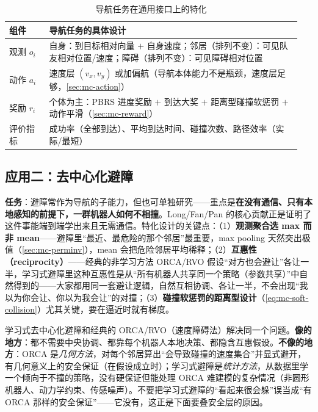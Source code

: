 \begin{table}[H]\centering\small
\caption{导航任务在通用接口上的特化}
\label{tab:mc-app-nav}
\begin{tabular}{p{0.13\linewidth}p{0.82\linewidth}}
\toprule
组件 & 导航任务的具体设计 \\
\midrule
观测 $o_i$ & 自身：到目标相对向量 $+$ 自身速度；邻居（排列不变）：可见队友相对位置/速度；障碍（排列不变）：可见障碍相对位置 \\
动作 $a_i$ & 速度层 $(v_x,v_y)$ 或加偏航（导航本体能力不是瓶颈，速度层足够，\cref{sec:mc-action}） \\
奖励 $r_i$ & 个体为主：PBRS 进度奖励 $+$ 到达大奖 $+$ 距离型碰撞软惩罚 $+$ 动作平滑（\cref{sec:mc-reward}） \\
评价指标 & 成功率（全部到达）、平均到达时间、碰撞次数、路径效率（实际/最短） \\
\bottomrule
\end{tabular}
\end{table}

\subsection{应用二：去中心化避障}
\label{sec:mc-app-avoid}
\textbf{任务}：避障常作为导航的子能力，但也可单独研究——重点是\textbf{在没有通信、只有本地感知的前提下，一群机器人如何不相撞}。Long/Fan/Pan 的核心贡献正是证明了这件事能端到端学出来且无需通信\cite{long2018collision}。特化设计的关键点：（1）\textbf{观测聚合选 max 而非 mean}——避障里“最近、最危险的那个邻居”最重要，max pooling 天然突出极值（\cref{sec:mc-perminv}），mean 会把危险邻居平均稀释；（2）\textbf{互惠性（reciprocity）}——经典的非学习方法 ORCA/RVO\cite{vandenberg2011orca} 假设“对方也会避让”各让一半，学习式避障里这种互惠性是从“所有机器人共享同一个策略（参数共享）”中自然得到的——大家都用同一套避让逻辑，自然互相协调、各让一半，不会出现“我以为你会让、你以为我会让”的对撞；（3）\textbf{碰撞软惩罚的距离型设计}（\cref{eq:mc-soft-collision}）尤其关键，要在逼近时就有梯度。

\begin{insight}
学习式去中心化避障和经典的 ORCA/RVO（速度障碍法）解决同一个问题。\textbf{像的地方}：都不需要中央协调、都靠每个机器人本地决策、都隐含互惠假设。\textbf{不像的地方}：ORCA 是\emph{几何方法}，对每个邻居算出“会导致碰撞的速度集合”并显式避开，有几何意义上的安全保证（在假设成立时）；学习式避障是\emph{统计方法}，从数据里学一个倾向于不撞的策略，没有硬保证但能处理 ORCA 难建模的复杂情况（非圆形机器人、动力学约束、传感噪声）。不要把学习式避障的“看起来很会躲”误当成“有 ORCA 那样的安全保证”——它没有，这正是下面要叠安全层的原因。
\end{insight}

